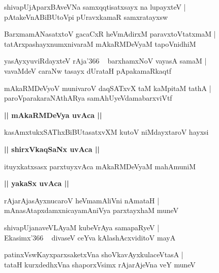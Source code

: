 \documentclass[twoside,12pt,openright]{book}
\newcounter{shloka}[chapter]
\def\uvaca#1{\centerline{{\large\textbf{#1}}}}
\begin{document}
\begin{shloka}%
shivapUjAparxBAveVNa samxqqtisatxsayx na lupayxteV |\\
pAtakeVnABiBUtoVpi pUravxkamaR samxratayxsw
\end{shloka}

\begin{shloka}%
BarxmamANasatxtoV gacaCxR heVmAdirxM paravxtoVtatxmaM |\\
tatArxpashayxnumxnivaraM mAkaRMDeVyaM tapoVnidhiM
\end{shloka}

\begin{shloka}%
yasAyxyuviRdayxteV rAja\char'366 ~ barxhamxNoV vayasA samaM |\\
vavaMdeV caraNw tasayx dUrataH pApakamaRkaqtf
\end{shloka}

\begin{shloka}%
mAkaRMDeVyoV munivaroV daqSATxvX taM kaMpitaM tathA |\\
paroVparakaraNAthARya samAhUyeVdamabarxviVtf
\end{shloka}

\uvaca{|| mAkaRMDeVya uvAca ||}

\begin{shloka}%
kasAmxtukxSAThxBiBUtasatxvXM kutoV niMdayxtaroV hayxsi 
\end{shloka}

\uvaca{|| shirxVkaqSaNx uvAca ||}

\begin{shloka}%
ituyxkatxsasx parxtuyxvAca mAkaRMDeVyaM mahAmuniM 
\end{shloka}

\uvaca{|| yakaSx uvAca ||}

\begin{shloka}%
rAjarAjasAyxnucaroV heVmamAliVni nAmataH |\\
mAnasAtapxdamxnicayamAniVya parxtayxhaM muneV
\end{shloka}

\begin{shloka}%
shivapUjanaveVLAyaM kubeVrAya samapaRyeV |\\
Ekasimx\char'366 ~ divaseV ceYva kAlashAcxviditoV mayA 
\end{shloka}

\begin{shloka}%
patinxVswKayxparxsaketxVna shoVkavAyxkulaceVtasA |\\
tataH kurxdedhxVna shaporxVsimx rAjarAjeVna veY muneV 
\end{shloka}
\end{document}
